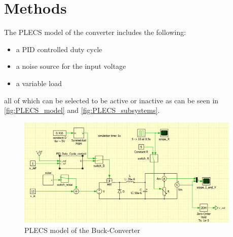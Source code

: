 \chapter{Methods}
\label{chapter:methods}

The PLECS model of the converter includes the following:
\begin{itemize}
    \item a PID controlled duty cycle
    \item a noise source for the input voltage
    \item a variable load
\end{itemize}

all of which can be selected to be active or inactive as can be seen in \autoref{fig:PLECS_model} and \autoref{fig:PLECS_subsystems}.

\begin{figure}[htbp]
    \centering
    \includegraphics[width=0.95\textwidth]{img/PLECS_model_full_view.png}
    \caption{PLECS model of the Buck-Converter}
    \label{fig:PLECS_model}
\end{figure}

